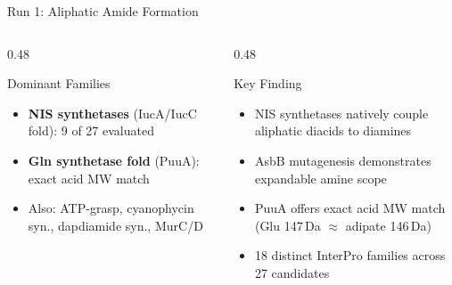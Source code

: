 \documentclass[aspectratio=169, 11pt]{beamer}
\begin{document}
\begin{frame}{Run 1: Aliphatic Amide Formation}
\vspace{2pt}
\begin{columns}[T]
\begin{column}{0.48\textwidth}
\begin{exampleblock}{\scriptsize Dominant Families}
\vspace{-2pt}
\begin{itemize}\scriptsize
\setlength\itemsep{0pt}
\item \textbf{NIS synthetases} (IucA/IucC fold): 9 of 27 evaluated
\item \textbf{Gln synthetase fold} (PuuA): exact acid MW match
\item Also: ATP-grasp, cyanophycin syn., dapdiamide syn., MurC/D
\end{itemize}
\end{exampleblock}
\end{column}
\begin{column}{0.48\textwidth}
\begin{block}{\scriptsize Key Finding}
\vspace{-2pt}
\begin{itemize}\scriptsize
\setlength\itemsep{0pt}
\item NIS synthetases natively couple aliphatic diacids to diamines
\item AsbB mutagenesis demonstrates expandable amine scope
\item PuuA offers exact acid MW match (Glu 147\,Da $\approx$ adipate 146\,Da)
\item 18 distinct InterPro families across 27 candidates
\end{itemize}
\end{block}
\end{column}
\end{columns}
\end{frame}
\end{document}
